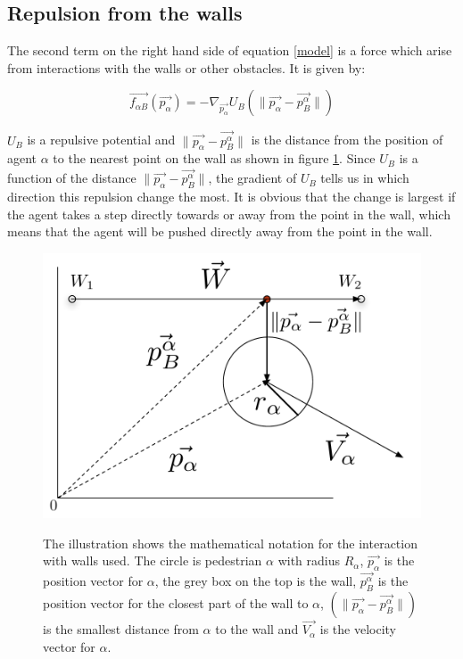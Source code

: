 \subsection{Repulsion from the walls}
The second term on the right hand side of equation \eqref{model} is a force which 
arise from interactions with the walls or other obstacles. It is given by:

\begin{equation}\label{wallpotential}
    \overrightarrow{f_{\alpha B}} \left( \overrightarrow{p_{\alpha}} \right) =
    - \nabla_{\overrightarrow{p_{\alpha}}} U_{B}
    \left( \| \overrightarrow{p_{\alpha}} - \overrightarrow{p_{B}^{\alpha}} \| \right)
\end{equation}

$U_B$ is a repulsive potential and $\|\overrightarrow{p_{\alpha}} - \overrightarrow{p_{B}^{\alpha}}\|$ 
is the distance from the position of agent $\alpha$ to the nearest point on the 
wall as shown in figure \ref{NotationOfWall}. Since $U_B$ is a function of the distance 
$\| \overrightarrow{p_{\alpha}} - \overrightarrow{p_{B}^{\alpha}} \|$, the gradient of $U_B$ tells us in 
which direction this repulsion change the most. It is obvious that the change is 
largest if the agent takes a step directly towards or away from the point in the wall, 
which means that the agent will be pushed directly away from the point in the wall.

\begin{figure}[ht]
\centering
{\includegraphics[scale=0.35]{Figures/NotationOfWall.pdf}} 
\caption[Notation of the interaction between an agent and a wall]{The illustration shows the mathematical notation for the interaction with walls used. The circle is pedestrian $\alpha$ with radius $R_{\alpha}$, $\overrightarrow{p_{\alpha}}$ is the position vector for $\alpha$, the grey box on the top is the wall, $\overrightarrow{p_{B}^{\alpha}}$ is the position vector for the closest part of the wall to $\alpha$, $\left( \| \overrightarrow{p_{\alpha}} - \overrightarrow{p_{B}^{\alpha}} \| \right)$ is the smallest distance from $\alpha$ to the wall and $\overrightarrow{V_{\alpha}}$ is the velocity vector for $\alpha$.}
\label{NotationOfWall}
\end{figure}

